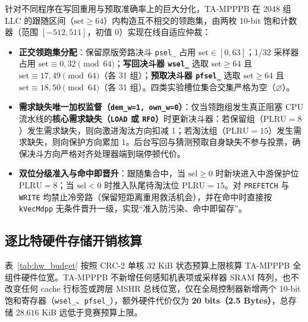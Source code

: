 \documentclass[10.5pt,compsoc,UTF8]{CjC}
\begin{document}
针对不同程序在写回重用与预取准确率上的巨大分化，TA-MPPPB 在 2048 组 LLC 的跟随区间（$\mathrm{set}\ge 64$）内构造互不相交的领跑集，由两枚 10-bit 饱和计数器（范围 $[-512, 511]$，初值 0）实现在线自适应仲裁：
\begin{itemize}
  \item \textbf{正交领跑集分配}：保留原版旁路决斗 \texttt{psel\_} 占用 $\mathrm{set}\in[0,63]$；1/32 采样器占用 $\mathrm{set}\equiv 0,32\pmod{64}$；\textbf{写回决斗器 \texttt{wsel\_}} 选取 $\mathrm{set}\ge 64$ 且 $\mathrm{set}\equiv 17,49\pmod{64}$（各 31 组）；\textbf{预取决斗器 \texttt{pfsel\_}} 选取 $\mathrm{set}\ge 64$ 且 $\mathrm{set}\equiv 18,50\pmod{64}$（各 31 组）。四类实验槽位集合交集严格为空（$\varnothing$）。
  \item \textbf{需求缺失唯一加权监督（\texttt{dem\_w=1, own\_w=0}）}：仅当领跑组发生真正阻塞 CPU 流水线的\textbf{核心需求缺失（\texttt{LOAD} 或 \texttt{RFO}）}时更新决斗器：若保留组（$\mathrm{PLRU}=8$）发生需求缺失，则向激进淘汰方向扣减 1；若淘汰组（$\mathrm{PLRU}=15$）发生需求缺失，则向保护方向累加 1。后台写回与猜测预取自身缺失不参与投票，确保决斗方向严格对齐处理器端到端停顿代价。
  \item \textbf{双位分级准入与命中即晋升}：跟随集合中，当 $\mathrm{sel}\ge 0$ 时新块进入中游保护位 $\mathrm{PLRU}=8$；当 $\mathrm{sel}<0$ 时推入队尾待淘汰位 $\mathrm{PLRU}=15$。对 \texttt{PREFETCH} 与 \texttt{WRITE} 均禁止冷旁路（保留短距离重用救活机会），并在命中时直接按 \texttt{kVecMdpp} 无条件晋升一级，实现“准入防污染、命中即留存”。
\end{itemize}

\subsection{逐比特硬件存储开销核算}

表~\ref{tab:hw_budget} 按照 CRC-2 单核 $32\text{ KiB}$ 状态预算上限核算 TA-MPPPB 全组件硬件位宽。TA-MPPPB 不新增任何感知机表项或采样器 SRAM 阵列，也不改变任何 cache 行标签或跨层 MSHR 总线位宽，仅在全局控制器新增两个 10-bit 饱和寄存器（\texttt{wsel\_}、\texttt{pfsel\_}），额外硬件代价仅为 \textbf{20 bits（2.5 Bytes）}，总存储 $28.616\text{ KiB}$ 远低于竞赛预算上限。
\end{document}
